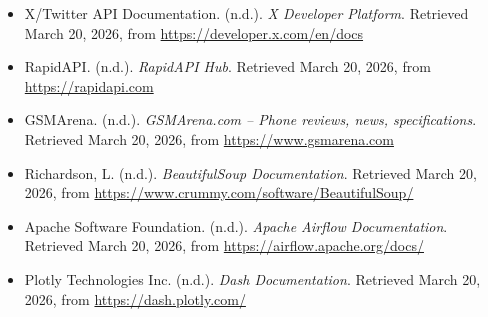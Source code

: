 \documentclass[12pt]{article}
\begin{document}
\begin{itemize}
    \item X/Twitter API Documentation. (n.d.). \textit{X Developer Platform}. Retrieved March 20, 2026, from \url{https://developer.x.com/en/docs}
    
    \item RapidAPI. (n.d.). \textit{RapidAPI Hub}. Retrieved March 20, 2026, from \url{https://rapidapi.com}
    
    \item GSMArena. (n.d.). \textit{GSMArena.com – Phone reviews, news, specifications}. Retrieved March 20, 2026, from \url{https://www.gsmarena.com}
    
    \item Richardson, L. (n.d.). \textit{BeautifulSoup Documentation}. Retrieved March 20, 2026, from \url{https://www.crummy.com/software/BeautifulSoup/}
    
    \item Apache Software Foundation. (n.d.). \textit{Apache Airflow Documentation}. Retrieved March 20, 2026, from \url{https://airflow.apache.org/docs/}
    
    \item Plotly Technologies Inc. (n.d.). \textit{Dash Documentation}. Retrieved March 20, 2026, from \url{https://dash.plotly.com/}
\end{itemize}
\end{document}
